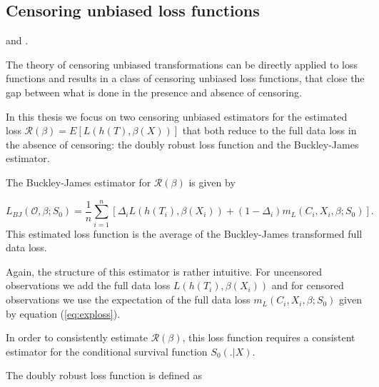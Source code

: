 \documentclass[12pt, a4paper]{article}
\theoremstyle{definition}
\theoremstyle{plain}
\numberwithin{equation}{section}
\numberwithin{figure}{section}
\numberwithin{table}{section}
\begin{document}
	\subsection{Censoring unbiased loss functions}\label{sec:cudls}
	\citet*{culs} and \citet*{basearticle}.
	
	The theory of censoring unbiased transformations can be directly applied to loss functions and results in a class of censoring unbiased loss functions, that close the gap between what is done in the presence and absence of censoring.
	
	In this thesis we focus on two censoring unbiased estimators for the estimated loss $\mathcal{R} (\beta) = E[L(h(T),\beta(X))]$ that both reduce to the full data loss in the absence of censoring: the doubly robust loss function and the Buckley-James estimator.
	
	
	The Buckley-James estimator for $\mathcal{R}(\beta)$ is given by
	
	\begin{equation}\label{eq:bj}
	L_{BJ}(\mathcal{O}, \beta; S_0) = \frac{1}{n} \sum_{i=1}^n \left[ \Delta_i L(h(T_i), \beta(X_i))+(1-\Delta_i)m_L(C_i, X_i, \beta; S_0)\right].
	\end{equation}
	This estimated loss function is the average of the Buckley-James transformed full data loss.
	
	Again, the structure of this estimator is rather intuitive.
	For uncensored observations we add the full data loss $L(h(T_i), \beta(X_i))$ and for censored observations we use the expectation of the full data loss $m_L(C_i, X_i, \beta; S_0)$ given by equation (\ref{eq:exploss}).
	
	In order to consistently estimate $\mathcal{R}(\beta)$, this loss function requires a consistent estimator for the conditional survival function $S_0(.\vert X)$.
	
	The doubly robust loss function is defined as
	
	
\end{document}
